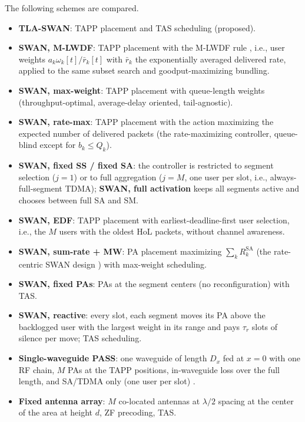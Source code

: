 \documentclass[journal]{IEEEtran}
\begin{document}
The following schemes are compared.
\begin{itemize}[leftmargin=*]
\item \textbf{TLA-SWAN}: TAPP placement and TAS scheduling (proposed).
\item \textbf{SWAN, M-LWDF}: TAPP placement with the M-LWDF rule \cite{Andrews2001}, i.e., user weights $a_k\omega_k[t]/\bar r_k[t]$ with $\bar r_k$ the exponentially averaged delivered rate, applied to the same subset search and goodput-maximizing bundling.
\item \textbf{SWAN, max-weight}: TAPP placement with queue-length weights (throughput-optimal, average-delay oriented, tail-agnostic).
\item \textbf{SWAN, rate-max}: TAPP placement with the action maximizing the expected number of delivered packets (the rate-maximizing controller, queue-blind except for $b_k\le Q_k$).
\item \textbf{SWAN, fixed SS / fixed SA}: the controller is restricted to segment selection ($j=1$) or to full aggregation ($j=M$, one user per slot, i.e., always-full-segment TDMA); \textbf{SWAN, full activation} keeps all segments active and chooses between full SA and SM.
\item \textbf{SWAN, EDF}: TAPP placement with earliest-deadline-first user selection, i.e., the $M$ users with the oldest HoL packets, without channel awareness.
\item \textbf{SWAN, sum-rate + MW}: PA placement maximizing $\sum_k R_k^{\mathrm{SA}}$ (the rate-centric SWAN design \cite{Ouyang2026SWAN,Gu2026SWANSumRate}) with max-weight scheduling.
\item \textbf{SWAN, fixed PAs}: PAs at the segment centers (no reconfiguration) with TAS.
\item \textbf{SWAN, reactive}: every slot, each segment moves its PA above the backlogged user with the largest weight in its range and pays $\tau_r$ slots of silence per move; TAS scheduling.
\item \textbf{Single-waveguide PASS}: one waveguide of length $D_x$ fed at $x=0$ with one RF chain, $M$ PAs at the TAPP positions, in-waveguide loss over the full length, and SA/TDMA only (one user per slot) \cite{Ding2025FlexibleAntenna}.
\item \textbf{Fixed antenna array}: $M$ co-located antennas at $\lambda/2$ spacing at the center of the area at height $d$, ZF precoding, TAS.
\end{itemize}
\end{document}
